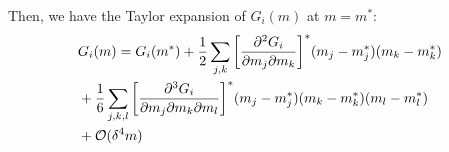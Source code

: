 \documentclass[prx,twocolumn,twoside,showpacs,superscriptaddress]{revtex4-1}
\begin{document}
Then, we have the Taylor expansion of  $G_i(m)$ at $m=m^*:$
\begin{align}
&G_i(m) = G_i(m^*) + \frac{1}{2} \sum_{j,k} \bigg[ \frac{\partial^2 G_i}{\partial m_j \partial m_k} \bigg]^* (m_j-m_j^*)(m_k-m_k^*) \nonumber \\
&+ \frac{1}{6} \sum_{j,k,l} \bigg[ \frac{\partial^3 G_i}{\partial m_j \partial m_k \partial m_l} \bigg]^* (m_j-m_j^*)(m_k-m_k^*)(m_l-m_l^*)\nonumber \\
& +{\cal O}(\delta^4 m) 
\end{align}
\end{document}
